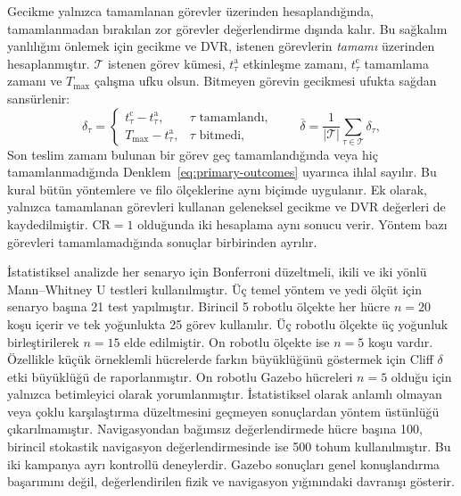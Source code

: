 \documentclass[10pt,letterpaper,onecolumn]{IEEEtran}
\begin{document}
Gecikme yalnızca tamamlanan görevler üzerinden hesaplandığında, tamamlanmadan
bırakılan zor görevler değerlendirme dışında kalır. Bu sağkalım yanlılığını
önlemek için gecikme ve DVR, istenen görevlerin \emph{tamamı} üzerinden
hesaplanmıştır.
$\mathcal{T}$ istenen görev kümesi, $t^{\mathrm{a}}_\tau$ etkinleşme zamanı,
$t^{\mathrm{c}}_\tau$ tamamlama zamanı ve $T_{\max}$ çalışma ufku olsun.
Bitmeyen görevin gecikmesi ufukta sağdan sansürlenir:
\begin{equation}
  \delta_\tau =
  \begin{cases}
    t^{\mathrm{c}}_\tau - t^{\mathrm{a}}_\tau, & \tau \text{ tamamlandı},\\[2pt]
    T_{\max} - t^{\mathrm{a}}_\tau,             & \tau \text{ bitmedi},
  \end{cases}
  \qquad
  \overline{\delta} = \frac{1}{|\mathcal{T}|}\sum_{\tau\in\mathcal{T}}\delta_\tau ,
  \label{eq:fairdelay}
\end{equation}
Son teslim zamanı bulunan bir görev geç tamamlandığında veya hiç
tamamlanmadığında Denklem~\eqref{eq:primary-outcomes} uyarınca ihlal sayılır.
Bu kural bütün yöntemlere ve filo ölçeklerine aynı biçimde uygulanır. Ek olarak,
yalnızca tamamlanan görevleri kullanan geleneksel gecikme ve DVR değerleri de
kaydedilmiştir. CR${=}1$ olduğunda iki hesaplama aynı sonucu verir. Yöntem bazı
görevleri tamamlamadığında sonuçlar birbirinden ayrılır.

İstatistiksel analizde her senaryo için Bonferroni düzeltmeli, ikili ve iki
yönlü Mann--Whitney U testleri kullanılmıştır. Üç temel yöntem ve yedi ölçüt
için senaryo başına 21 test yapılmıştır. Birincil 5 robotlu ölçekte her hücre
$n{=}20$ koşu içerir ve tek yoğunlukta 25 görev kullanılır. Üç robotlu ölçekte
üç yoğunluk birleştirilerek $n{=}15$ elde edilmiştir. On robotlu ölçekte ise
$n{=}5$ koşu vardır. Özellikle küçük örneklemli hücrelerde farkın büyüklüğünü
göstermek için Cliff $\delta$ etki büyüklüğü de raporlanmıştır. On robotlu
Gazebo hücreleri $n{=}5$ olduğu için yalnızca betimleyici olarak
yorumlanmıştır. İstatistiksel olarak anlamlı olmayan veya çoklu karşılaştırma
düzeltmesini geçmeyen sonuçlardan yöntem üstünlüğü çıkarılmamıştır.
Navigasyondan bağımsız değerlendirmede hücre başına 100, birincil stokastik
navigasyon değerlendirmesinde ise 500 tohum kullanılmıştır. Bu iki kampanya
ayrı kontrollü deneylerdir. Gazebo sonuçları genel konuşlandırma başarımını
değil, değerlendirilen fizik ve navigasyon yığınındaki davranışı gösterir.

\end{document}
